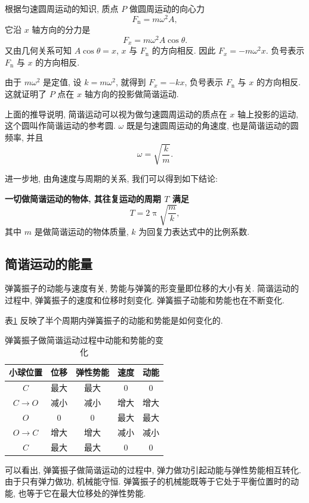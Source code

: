 \documentclass[UTF8,openany,fontset=fandol]{ctexbook}
\theoremstyle{chinesetextbook}
\begin{document}
根据匀速圆周运动的知识, 质点 $P$ 做圆周运动的向心力
\[
F_\text{n}=m\omega^2A,
\]
它沿 $x$ 轴方向的分力是
\[
F_{x}=m\omega^2A\cos\theta.
\]
又由几何关系可知 $A\cos\theta=x$, $x$ 与 $F_\text{n}$ 的方向相反. 因此 $F_{x}=-m\omega^2x$. 负号表示 $F_\text{n}$ 与 $x$ 的方向相反.

由于 $m\omega^2$ 是定值, 设 $k=m\omega^2$, 就得到 $F_{x}=-kx$, 负号表示 $F_\text{n}$ 与 $x$ 的方向相反. 这就证明了 $P$ 点在 $x$ 轴方向的投影做简谐运动.

上面的推导说明, 简谐运动可以视为做匀速圆周运动的质点在 $x$ 轴上投影的运动, 这个圆叫作简谐运动的参考圆. $\omega$ 既是匀速圆周运动的角速度, 也是简谐运动的圆频率, 并且
\[
\omega=\sqrt{\frac{k}{m}}.
\]

进一步地, 由角速度与周期的关系, 我们可以得到如下结论:

\textbf{一切做简谐运动的物体, 其往复运动的周期 $T$ 满足}
\begin{equation}\label{eq:简谐运动周期公式}
T=2\uppi\sqrt{\frac{m}{k}},
\end{equation}
其中 $m$ 是做简谐运动的物体质量, $k$ 为回复力表达式中的比例系数.
\subsection{简谐运动的能量}\label{sec:简谐运动的能量}
弹簧振子的动能与速度有关, 势能与弹簧的形变量即位移的大小有关. 简谐运动的过程中, 弹簧振子的速度和位移时刻变化. 弹簧振子动能和势能也在不断变化.

表\ref{tab:弹簧振子表格} 反映了半个周期内弹簧振子的动能和势能是如何变化的.

\begin{table}[htbp]
\centering
\caption{弹簧振子做简谐运动过程中动能和势能的变化}
\label{tab:弹簧振子表格}
\begin{tabular}{|c|c|c|c|c|}
\hline
\textbf{小球位置} & \textbf{位移} & \textbf{弹性势能} & \textbf{速度} & \textbf{动能} \\
\hline
$C$ & 最大 & 最大 & 0 & 0 \\
\hline
$C\rightarrow O$ & 减小 & 减小 & 增大 & 增大 \\
\hline
$O$ & 0 & 0 & 最大 & 最大 \\
\hline
$O\rightarrow C$ & 增大 & 增大 & 减小 & 减小 \\
\hline
$C$ & 最大 & 最大 & 0 & 0 \\
\hline
\end{tabular}
\end{table}

可以看出, 弹簧振子做简谐运动的过程中, 弹力做功引起动能与弹性势能相互转化. 由于只有弹力做功, 机械能守恒. 弹簧振子的机械能既等于它处于平衡位置时的动能, 也等于它在最大位移处的弹性势能.
\end{document}
